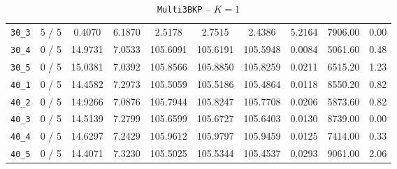 \begin{table}[h!]
\begin{center}
\begin{tabular}{| c | c | c | c | c | c | c | c | c | c |}
\verb|30_3| & 5 / 5 & 0.4070 & 6.1870 & 2.5178 & 2.7515 & 2.4386 & 5.2164 & 7906.00 & 0.00\\ 
\verb|30_4| & 0 / 5 & 14.9731 & 7.0533 & 105.6091 & 105.6191 & 105.5948 & 0.0084 & 5061.60 & 0.48\\ 
\verb|30_5| & 0 / 5 & 15.0381 & 7.0392 & 105.8566 & 105.8850 & 105.8259 & 0.0211 & 6515.20 & 1.23\\ 
\verb|40_1| & 0 / 5 & 14.4582 & 7.2973 & 105.5059 & 105.5186 & 105.4864 & 0.0118 & 8550.20 & 0.82\\ 
\verb|40_2| & 0 / 5 & 14.9266 & 7.0876 & 105.7944 & 105.8247 & 105.7708 & 0.0206 & 5873.60 & 0.82\\ 
\verb|40_3| & 0 / 5 & 14.5139 & 7.2799 & 105.6599 & 105.6727 & 105.6403 & 0.0130 & 8739.00 & 0.00\\ 
\verb|40_4| & 0 / 5 & 14.6297 & 7.2429 & 105.9612 & 105.9797 & 105.9459 & 0.0125 & 7414.00 & 0.33\\ 
\verb|40_5| & 0 / 5 & 14.4071 & 7.3230 & 105.5025 & 105.5344 & 105.4537 & 0.0293 & 9061.00 & 2.06\\ 
\hline
\end{tabular}
\caption{\texttt{Multi3BKP} -- $K = 1$}
\label{table:multi:1}
\end{center}
\end{table}


